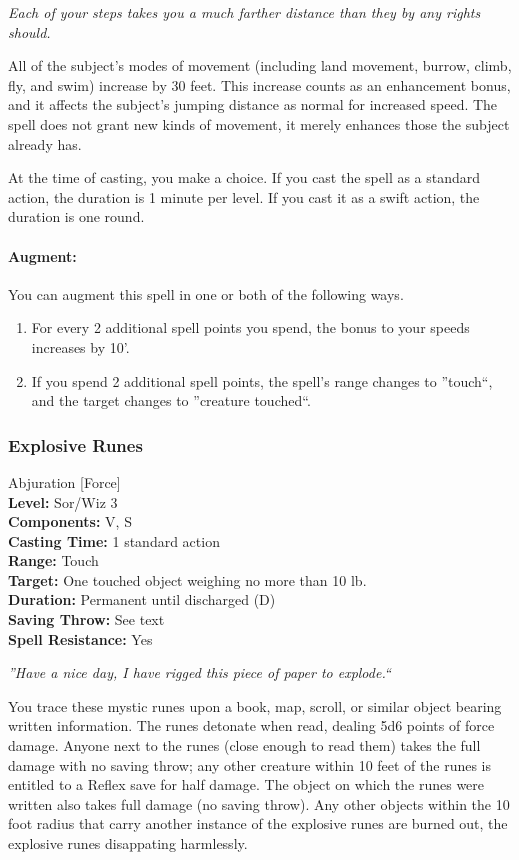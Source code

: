 \emph{Each of your steps takes you a much farther distance than they by any rights should.}

All of the subject's modes of movement (including land movement, burrow, climb, fly, and swim) increase by 30 feet. This increase counts as an enhancement bonus, and it affects the subject's jumping distance as normal for increased speed. The spell does not grant new kinds of movement, it merely enhances those the subject already has.

At the time of casting, you make a choice. If you cast the spell as a standard action, the duration is 1 minute per level. 
If you cast it as a swift action, the duration is one round.

\paragraph{Augment:}  You can augment this spell in one or both of the following ways.
\begin{enumerate}
 \item For every 2 additional spell points you spend, the bonus to your speeds increases by 10'.
 \item If you spend 2 additional spell points, the spell's range changes to ''touch``, and the target changes to ''creature touched``. 
\end{enumerate}
\subsubsection{Explosive Runes}
\label{Spell:ExplosiveRunes}
Abjuration [Force]
\\ \textbf{Level:} Sor/Wiz 3
\\ \textbf{Components:} V, S
\\ \textbf{Casting Time:} 1 standard action
\\ \textbf{Range:} Touch
\\ \textbf{Target:} One touched object weighing no more than 10 lb.
\\ \textbf{Duration:} Permanent until discharged (D)
\\ \textbf{Saving Throw:} See text
\\ \textbf{Spell Resistance:} Yes

\emph{''Have a nice day, I have rigged this piece of paper to explode.``}

You trace these mystic runes upon a book, map, scroll, or similar object bearing written information. 
The runes detonate when read, dealing 5d6 points of force damage. 
Anyone next to the runes (close enough to read them) takes the full damage with no saving throw; 
any other creature within 10 feet of the runes is entitled to a Reflex save for half damage. 
The object on which the runes were written also takes full damage (no saving throw).
Any other objects within the 10 foot radius that carry another instance of the explosive runes
are burned out, the explosive runes disappating harmlessly.

